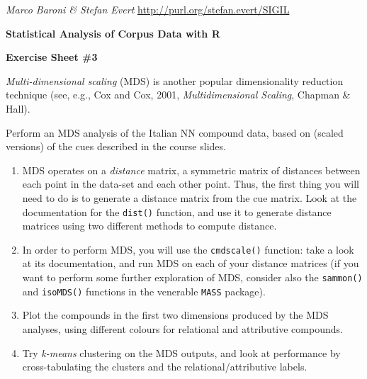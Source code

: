 \documentclass[a4paper,12pt]{article}
\newcommand{\REM}[1]{\textrm{\color[rgb]{.7,.2,.1}\# #1}}
\begin{document}
\emph{Marco Baroni \& Stefan Evert} \hfill %
{\small \url{http://purl.org/stefan.evert/SIGIL}}

\begin{center}
  \textbf{\Large Statistical Analysis of Corpus Data with R}

  \textbf{\large Exercise Sheet \#3}
\end{center}

\emph{Multi-dimensional scaling} (MDS) is another popular
dimensionality reduction technique (see, e.g., Cox and Cox, 2001,
\emph{Multidimensional Scaling}, Chapman \& Hall).

Perform an MDS analysis of the Italian NN compound data, based on
(scaled versions) of the cues described in the course slides.

\begin{enumerate}
\item MDS operates on a \emph{distance} matrix, a symmetric matrix of
  distances between each point in the data-set and each other
  point. Thus, the first thing you will need to do is to generate a
  distance matrix from the cue matrix. Look at the documentation for
  the \texttt{dist()} function, and use it to generate distance
  matrices using two different methods to compute distance.
\item In order to perform MDS, you will use the \texttt{cmdscale()}
  function: take a look at its documentation, and run MDS on each of
  your distance matrices (if you want to perform some further
  exploration of MDS, consider also the \texttt{sammon()} and
  \texttt{isoMDS()} functions in the venerable \texttt{MASS} package).
\item Plot the compounds in the first two dimensions produced by the
  MDS analyses, using different colours for relational and attributive
  compounds.
\item Try \emph{k-means} clustering on the MDS outputs, and look at
  performance by cross-tabulating the clusters and the
  relational/attributive labels.
\end{enumerate}







\end{document}

